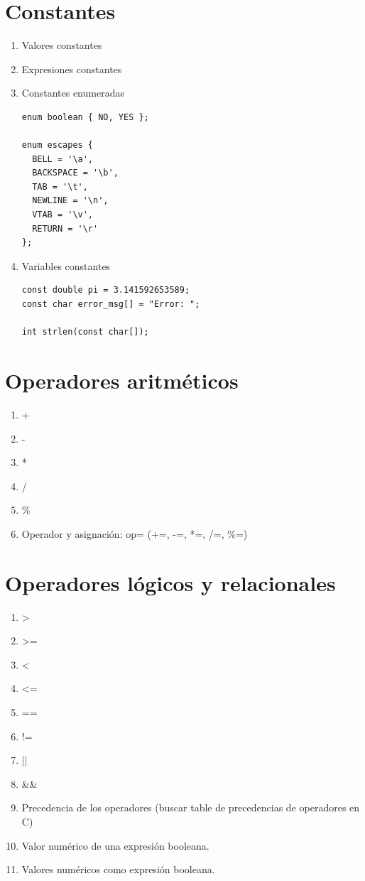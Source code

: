 \documentclass[a4paper,oneside]{article}
\begin{document}
\section{Constantes}
  \begin{enumerate}
  \item Valores constantes
  \item Expresiones constantes
  \item Constantes enumeradas

    \begin{verbatim}
enum boolean { NO, YES };

enum escapes {
  BELL = '\a',
  BACKSPACE = '\b',
  TAB = '\t',
  NEWLINE = '\n',
  VTAB = '\v',
  RETURN = '\r'
};
    \end{verbatim}
  \item Variables constantes

    \begin{verbatim}
const double pi = 3.141592653589;
const char error_msg[] = "Error: ";

int strlen(const char[]);
    \end{verbatim}
  \end{enumerate}

\section{Operadores aritméticos}
  \begin{enumerate}
  \item +
  \item -
  \item *
  \item /
  \item \%
  \item Operador y asignación: op= (+=, -=, *=, /=, \%=)
  \end{enumerate}

\section{Operadores lógicos y relacionales}
  \begin{enumerate}
  \item >
  \item >=
  \item <
  \item <=
  \item ==
  \item !=
  \item ||
  \item \&\&
  \item Precedencia de los operadores (buscar table de precedencias de operadores en C)
  \item Valor numérico de una expresión booleana.
  \item Valores numéricos como expresión booleana.
  \end{enumerate}
\end{document}
